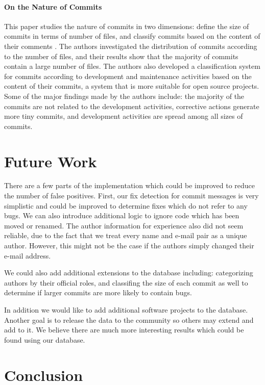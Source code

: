 \documentclass[preprint, 11pt]{sigplanconf}
\begin{document}
\paragraph{On the Nature of Commits}
This paper studies the nature of commits in two dimensions: define the
size of commits in terms of number of files, and classify commits
based on the content of their comments \cite{hattori2008nature}. The
authors investigated the distribution of commits according to the
number of files, and their results show that the majority of commits
contain a large number of files. The authors also developed a
classification system for commits according to development and
maintenance activities based on the content of their commits, a system
that is more suitable for open source projects. Some of the major
findings made by the authors include: the majority of the commits are
not related to the development activities, corrective actions generate
more tiny commits, and development activities are spread among all
sizes of commits.

\section{Future Work}
\label{sec-future}

There are a few parts of the implementation which could be improved to
reduce the number of false positives. First, our fix detection for
commit messages is very simplistic and could be improved to determine
fixes which do not refer to any bugs. We can also introduce additional
logic to ignore code which has been moved or renamed. The author
information for experience also did not seem reliable, due to the fact
that we treat every name and e-mail pair as a unique author. However, this
might not be the case if the authors simply changed their e-mail address. 

We could also add additional extensions to the database including: categorizing
authors by their official roles, and classifing the size of each commit as
well to determine if larger commits are more likely to contain bugs.

In addition we would like to add additional software projects to the
database. Another goal is to release the data to the community so
others may extend and add to it. We believe there are much more
interesting results which could be found using our database.

\section{Conclusion}
\label{sec-conclusion}
\end{document}
